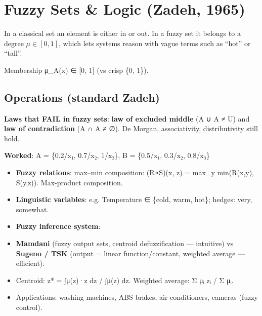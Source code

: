 \needspace{155pt}

\hypertarget{p2-10--8-fuzzy-sets--logic-zadeh-1965}{%
\section{Fuzzy Sets \& Logic (Zadeh, 1965)}\label{p2-10--8-fuzzy-sets--logic-zadeh-1965}}

In a classical set an element is either in or out. In a fuzzy set it belongs to a degree \(\mu \in [0, 1]\),
which lets systems reason with vague terms such as ``hot'' or ``tall''.

Membership μ\_A(x) ∈ {[}0, 1{]} (vs crisp \{0, 1\}).



\needspace{95pt}

\hypertarget{p2-10--operations-standard-zadeh}{%
\subsection{Operations (standard Zadeh)}\label{p2-10--operations-standard-zadeh}}



\textbf{Laws that FAIL in fuzzy sets}: \textbf{law of excluded middle} (A ∪ A\textquotesingle{} ≠ U) and \textbf{law of contradiction} (A ∩ A\textquotesingle{} ≠ ∅). De Morgan, associativity, distributivity still hold.

\textbf{Worked}: A = \{0.2/x₁, 0.7/x₂, 1/x₃\}, B = \{0.5/x₁, 0.3/x₂, 0.8/x₃\}



\begin{itemize}
\tightlist
\item
  \textbf{Fuzzy relations}: max--min composition: (R∘S)(x, z) = max\_y min(R(x,y), S(y,z)). Max-product composition.
\item
  \textbf{Linguistic variables}: e.g. Temperature ∈ \{cold, warm, hot\}; hedges: very, somewhat.
\item
  \textbf{Fuzzy inference system}:
\end{itemize}



\begin{itemize}
\tightlist
\item
  \textbf{Mamdani} (fuzzy output sets, centroid defuzzification --- intuitive) vs \textbf{Sugeno / TSK} (output = linear function/constant, weighted average --- efficient).
\item
  Centroid: z* = ∫μ(z)·z dz / ∫μ(z) dz. Weighted average: Σ μᵢ zᵢ / Σ μᵢ.
\item
  Applications: washing machines, ABS brakes, air-conditioners, cameras (fuzzy control).
\end{itemize}

